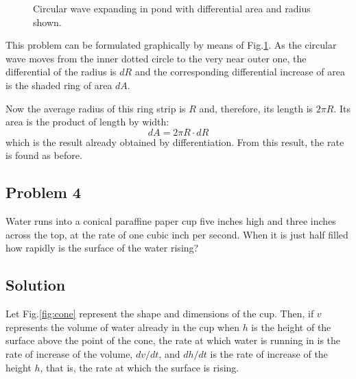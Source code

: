 \begin{figure}[h]
    \centering
    \caption{Circular wave expanding in pond with differential area and radius shown.}
    \label{fig:wave}
\end{figure}

This problem can be formulated graphically by means of Fig.\ref{fig:wave}. As the circular wave moves from the inner dotted circle to the very near outer one, the differential of the radius is $dR$ and the corresponding differential increase of area is the shaded ring of area $dA$.

Now the average radius of this ring strip is $R$ and, therefore, its length is $2\pi R$. Its area is the product of length by width:
\[dA = 2\pi R\cdot dR\]
which is the result already obtained by differentiation. From this result, the rate is found as before.

\subsection*{Problem 4}
Water runs into a conical paraffine paper cup five inches high and three inches across the top, at the rate of one cubic inch per second. When it is just half filled how rapidly is the surface of the water rising?

\subsection*{Solution}
Let Fig.\ref{fig:cone} represent the shape and dimensions of the cup. Then, if $v$ represents the volume of water already in the cup when $h$ is the height of the surface above the point of the cone, the rate at which water is running in is the rate of increase of the volume, $dv/dt$, and $dh/dt$ is the rate of increase of the height $h$, that is, the rate at which the surface is rising.

